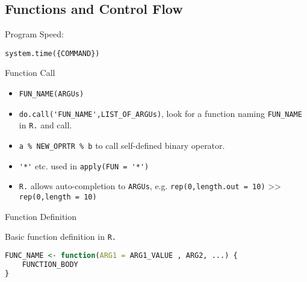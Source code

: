     




\subsection{Functions and Control Flow}
\begin{point}
    Program Speed:
\end{point}

\lstinline|system.time({COMMAND})|

\begin{point}
    Function Call
\end{point}
\begin{itemize}[topsep=2pt,itemsep=0pt]
    \item \lstinline|FUN_NAME(ARGUs)|
    \item \lstinline|do.call('FUN_NAME',LIST_OF_ARGUs)|, look for a function naming \lstinline|FUN_NAME| in \lstinline|R.| and call. 
    \item \lstinline|a % NEW_OPRTR % b| to call self-defined binary operator.
    \item \lstinline|'*'| etc. used in \lstinline|apply(FUN = '*')|
    \item \lstinline|R.| allows auto-completion to \lstinline|ARGUs|, e.g. \lstinline|rep(0,length.out = 10)| >> \lstinline|rep(0,length = 10)|
\end{itemize}


\begin{point}
    Function Definition
\end{point}

\begin{rcode}
    Basic function definition in \lstinline|R.|
\begin{lstlisting}[language=R]
FUNC_NAME <- function(ARG1 = ARG1_VALUE , ARG2, ...) {
    FUNCTION_BODY
}
\end{lstlisting}
\end{rcode}


